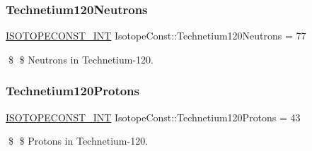 \subsubsection{\texorpdfstring{Technetium120\+Neutrons}{Technetium120Neutrons}}
{\footnotesize\ttfamily \mbox{\hyperlink{group___isotope_const-_macros_ga5f18360b3e99483a35c32d789e62621c}{I\+S\+O\+T\+O\+P\+E\+C\+O\+N\+S\+T\+\_\+\+I\+NT}} Isotope\+Const\+::\+Technetium120\+Neutrons = 77}

\$ \$ Neutrons in Technetium-\/120. \mbox{\label{group___isotope_const-_technetium-_tc120_ga3148aa8c8d6fb85631424c7868eb982a}} 
\subsubsection{\texorpdfstring{Technetium120\+Protons}{Technetium120Protons}}
{\footnotesize\ttfamily \mbox{\hyperlink{group___isotope_const-_macros_ga5f18360b3e99483a35c32d789e62621c}{I\+S\+O\+T\+O\+P\+E\+C\+O\+N\+S\+T\+\_\+\+I\+NT}} Isotope\+Const\+::\+Technetium120\+Protons = 43}

\$ \$ Protons in Technetium-\/120. 